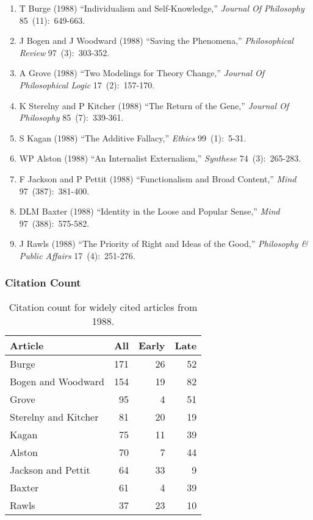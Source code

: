 \documentclass[
  10pt,
  letterpaper,
  DIV=11,
  numbers=noendperiod,
  twoside]{scrartcl}
\providecommand{\tightlist}{%
  \setlength{\itemsep}{0pt}\setlength{\parskip}{0pt}}\usepackage{longtable,booktabs,array}
\begin{document}
\begin{enumerate}
\def\labelenumi{\arabic{enumi}.}
\tightlist
\item
  T Burge (1988) ``Individualism and Self-Knowledge,'' \emph{Journal Of
  Philosophy} 85~(11):~649-663.
\item
  J Bogen and J Woodward (1988) ``Saving the Phenomena,''
  \emph{Philosophical Review} 97~(3):~303-352.
\item
  A Grove (1988) ``Two Modelings for Theory Change,'' \emph{Journal Of
  Philosophical Logic} 17~(2):~157-170.
\item
  K Sterelny and P Kitcher (1988) ``The Return of the Gene,''
  \emph{Journal Of Philosophy} 85~(7):~339-361.
\item
  S Kagan (1988) ``The Additive Fallacy,'' \emph{Ethics} 99~(1):~5-31.
\item
  WP Alston (1988) ``An Internalist Externalism,'' \emph{Synthese}
  74~(3):~265-283.
\item
  F Jackson and P Pettit (1988) ``Functionalism and Broad Content,''
  \emph{Mind} 97~(387):~381-400.
\item
  DLM Baxter (1988) ``Identity in the Loose and Popular Sense,''
  \emph{Mind} 97~(388):~575-582.
\item
  J Rawls (1988) ``The Priority of Right and Ideas of the Good,''
  \emph{Philosophy \& Public Affairs} 17~(4):~251-276.
\end{enumerate}

\subsubsection*{Citation Count}\label{sec-count-1988}

\begin{longtable}[]{@{}lrrr@{}}

\caption{\label{tbl-citation-count-1988}Citation count for widely cited
articles from 1988.}

\tabularnewline

\toprule\noalign{}
Article & All & Early & Late \\
\midrule\noalign{}
\endhead
\bottomrule\noalign{}
\endlastfoot
Burge & 171 & 26 & 52 \\
Bogen and Woodward & 154 & 19 & 82 \\
Grove & 95 & 4 & 51 \\
Sterelny and Kitcher & 81 & 20 & 19 \\
Kagan & 75 & 11 & 39 \\
Alston & 70 & 7 & 44 \\
Jackson and Pettit & 64 & 33 & 9 \\
Baxter & 61 & 4 & 39 \\
Rawls & 37 & 23 & 10 \\

\end{longtable}
\end{document}
